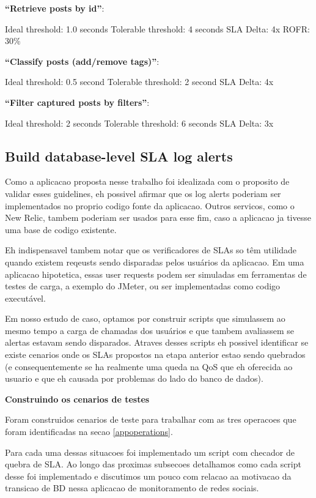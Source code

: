 \textbf{``Retrieve posts by id''}:

Ideal threshold: 1.0 seconds
Tolerable threshold: 4 seconds
SLA Delta: 4x
ROFR: 30\%

\textbf{``Classify posts (add/remove tags)''}:

Ideal threshold: 0.5 second
Tolerable threshold: 2 second
SLA Delta: 4x

\textbf{``Filter captured posts by filters''}:

Ideal threshold: 2 seconds
Tolerable threshold: 6 seconds
SLA Delta: 3x

\subsection{Build database-level SLA log alerts}

Como a aplicacao proposta nesse trabalho foi idealizada com o proposito de validar esses guidelines, eh possivel afirmar que os log alerts poderiam ser implementados no proprio codigo fonte da aplicacao. Outros servicos, como o New Relic, tambem poderiam ser usados para esse fim, caso a aplicacao ja tivesse uma base de codigo existente. 

Eh indispensavel tambem notar que os verificadores de SLAs so têm utilidade quando existem reqeusts sendo disparadas pelos usuários da aplicacao. Em uma aplicacao hipotetica, essas user requests podem ser simuladas em ferramentas de testes de carga, a exemplo do JMeter, ou ser implementadas como codigo executável.

Em nosso estudo de caso, optamos por construir scripts que simulassem ao mesmo tempo a carga de chamadas dos usuários e que tambem avaliassem se alertas estavam sendo disparados. Atraves desses scripts eh possivel identificar se existe cenarios onde os SLAs propostos na etapa anterior estao sendo quebrados (e consequentemente se ha realmente uma queda na QoS que eh oferecida ao usuario e que eh causada por problemas do lado do banco de dados).

\textbf{Construindo os cenarios de testes}

Foram construidos cenarios de teste para trabalhar com as tres operacoes que foram identificadas na secao \ref{appoperations}. 

Para cada uma dessas situacoes foi implementado um script com checador de quebra de SLA. Ao longo das proximas subsecoes detalhamos como cada script desse foi implementado e discutimos um pouco com relacao aa motivacao da transicao de BD nessa aplicacao de monitoramento de redes sociais.  


